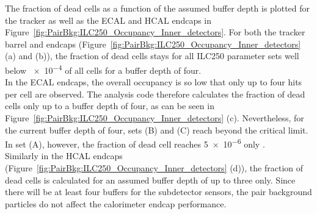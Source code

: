 The fraction of dead cells as a function of the assumed buffer depth is plotted for the \sid tracker as well as the ECAL and HCAL endcaps in Figure~\ref{fig:PairBkg:ILC250_Occupancy_Inner_detectors}.
For both the tracker barrel and endcaps (Figure~\ref{fig:PairBkg:ILC250_Occupancy_Inner_detectors} (a) and (b)), the fraction of dead cells stays for all ILC250 parameter sets well below \num{e-4} of all cells for a buffer depth of four.
\\In the ECAL endcaps, the overall occupancy is so low that only up to four hits per cell are observed.
The analysis code therefore calculates the fraction of dead cells only up to a buffer depth of four, as can be seen in Figure~\ref{fig:PairBkg:ILC250_Occupancy_Inner_detectors} (c).
Nevertheless, for the current buffer depth of four, sets (B) and (C) reach beyond the critical limit.
In set (A), however, the fraction of dead cell reaches \num{5e-6} only .
\\Similarly in the HCAL endcaps (Figure~\ref{fig:PairBkg:ILC250_Occupancy_Inner_detectors} (d)), the fraction of dead cells is calculated for an assumed buffer depth of up to three only.
Since there will be at least four buffers for the subdetector sensors, the pair background particles do not affect the calorimeter endcap performance.
